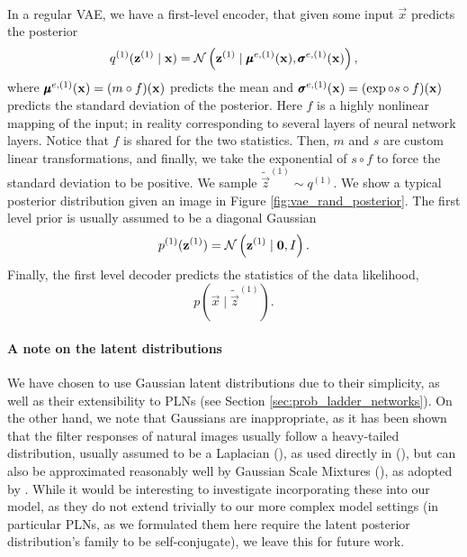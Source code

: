 \paragraph{}
In a regular VAE, we have a first-level encoder, that given some input
$\vec{x}$ predicts the posterior
\[
  q^{(1)}(\mathbf{z}^{(1)} \mid \mathbf{x}) = \mathcal{N}\left( \mathbf{z}^{(1)} \mid
  \pmb{\mu}^{e, (1)}(\mathbf{x}), \pmb{\sigma}^{e, (1)}(\mathbf{x}) \right),
\]
where $\pmb{\mu}^{e, (1)}(\mathbf{x}) = (m \circ f)(\mathbf{x})$ predicts the mean and
$\pmb{\sigma}^{e, (1)}(\mathbf{x}) = (\exp \circ s \circ f)(\mathbf{x})$ predicts the
standard deviation of the posterior. Here $f$ is a highly nonlinear mapping of
the input; in reality corresponding to several layers of neural network
layers. Notice that $f$ is shared for the two statistics. Then, $m$ and $s$ are
custom linear transformations, and finally, we take the exponential of $s \circ f
$ to force the standard deviation to be positive. We sample $\tilde{\vec{z}}^{(1)}
\sim q^{(1)}$. We show a typical posterior distribution given an image in Figure
\ref{fig:vae_rand_posterior}.
The first level prior is usually assumed to be a diagonal Gaussian
\[
  p^{(1)}(\mathbf{z}^{(1)})  = \mathcal{N}\left( \mathbf{z}^{(1)} \mid \mathbf{0}, I \right).
\]
Finally, the first level decoder predicts the statistics of the data likelihood,
\[
  p(\vec{x} \mid \tilde{\vec{z}}^{(1)}).
\]

\paragraph{A note on the latent distributions} We have chosen to use Gaussian
latent distributions due to their simplicity, as well as their extensibility to
PLNs (see Section \ref{sec:prob_ladder_networks}). On the other hand, we note
that Gaussians are inappropriate, as it has been shown that the filter responses
of natural images usually follow a heavy-tailed distribution, usually assumed to
be a Laplacian (\cite{jain1989fundamentals}), as used directly in
(\cite{clic2018winner}), but can also be approximated reasonably well by Gaussian
Scale Mixtures (\cite{portilla2003image}), as adopted by \cite{theis2017lossy}.
While it would be interesting to investigate incorporating these into our
model, as they do not extend trivially to our more complex model settings (in
particular PLNs, as we formulated them here require the latent posterior
distribution's family to be self-conjugate), we leave this for future work.




